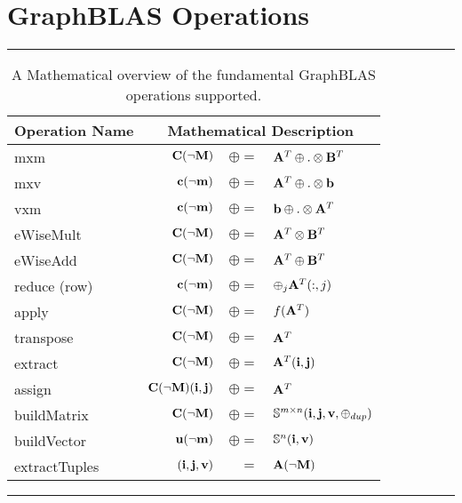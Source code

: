 \section{GraphBLAS Operations}
\label{Sec:Operations}

\begin{table*}[h]
\hrule
\begin{center}
\caption{A Mathematical overview of the fundamental GraphBLAS operations supported.}
\label{Tab:GraphBLASOps}
\begin{tabular}{l|rrl}
{\sf Operation Name} & \multicolumn{3}{c}{Mathematical Description}  \\
\hline
{\sf mxm}          & ${\bf C}(\neg{\bf M})$ & $\oplus=$ & ${\bf A}^T \oplus.\otimes {\bf B}^T$  \\
{\sf mxv}          & ${\bf c}(\neg{\bf m})$ & $\oplus=$ & ${\bf A}^T \oplus.\otimes {\bf b}$  \\
{\sf vxm}          & ${\bf c}(\neg{\bf m})$ & $\oplus=$ & ${\bf b} \oplus.\otimes {\bf A}^T$  \\
{\sf eWiseMult}    & ${\bf C}(\neg{\bf M})$ & $\oplus=$ & ${\bf A}^T \otimes {\bf B}^T$  \\
{\sf eWiseAdd}     & ${\bf C}(\neg{\bf M})$ & $\oplus=$ & ${\bf A}^T \oplus  {\bf B}^T$  \\
{\sf reduce} (row) & ${\bf c}(\neg{\bf m})$ & $\oplus=$ & $\oplus_j{\bf A}^T(:,j)$  \\
{\sf apply}        & ${\bf C}(\neg{\bf M})$ & $\oplus=$ & $f({\bf A}^T)$ \\
{\sf transpose}    & ${\bf C}(\neg{\bf M})$ & $\oplus=$ & ${\bf A}^T$ \\
{\sf extract}      & ${\bf C}(\neg{\bf M})$ & $\oplus=$ & ${\bf A}^T({\bf i},{\bf j})$ \\
{\sf assign}       & ${\bf C}(\neg{\bf M})({\bf i},{\bf j})$ & $\oplus=$ & ${\bf A}^T$ \\
{\sf buildMatrix}  & ${\bf C}(\neg{\bf M})$ & $\oplus=$ & $\mathbb{S}^{m\times n}({\bf i},{\bf j},{\bf v},\oplus_{dup})$ \\
{\sf buildVector}  & ${\bf u}(\neg{\bf m})$ & $\oplus=$ & $\mathbb{S}^{n}({\bf i},{\bf v})$ \\
{\sf extractTuples}& $({\bf i},{\bf j},{\bf v})$ & $=$ & ${\bf A}(\neg{\bf M})$ \\
\end{tabular}
\end{center}
\hrule
\end{table*}


